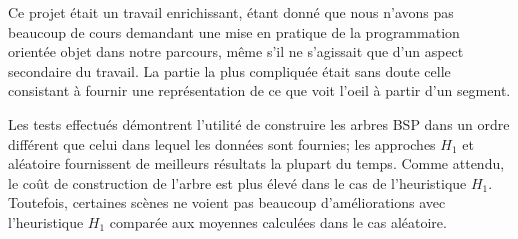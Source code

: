 Ce projet était un travail enrichissant, étant donné que nous n'avons
pas beaucoup de cours demandant une mise en pratique de la programmation
orientée objet dans notre parcours, même s'il ne s'agissait que d'un
aspect secondaire du travail. La partie la plus compliquée était
sans doute celle consistant à fournir une représentation de ce que voit
l'oeil à partir d'un segment.

Les tests effectués démontrent l'utilité de construire les arbres BSP
dans un ordre différent que celui dans lequel les données sont fournies;
les approches $H_1$ et aléatoire fournissent de meilleurs résultats
la plupart du temps. Comme attendu, le coût de construction de l'arbre
est plus élevé dans le cas de l'heuristique $H_1$. Toutefois, certaines
scènes ne voient pas beaucoup d'améliorations avec l'heuristique $H_1$
comparée aux moyennes calculées dans le cas aléatoire.


